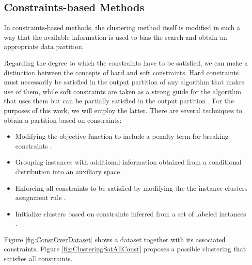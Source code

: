 \subsection{Constraints-based Methods}

In constraints-based methods, the clustering method itself is modified in such a way that the available information is used to bias the search and obtain an appropriate data partition.

Regarding the degree to which the constraints have to be satisfied, we can make a distinction between the concepts of hard \cite{wagstaff2001constrained,davidson2005agglomerative} and soft \cite{law2004clustering,basu2004active,segal2003discovering,davidson2005clustering,law2005model} constraints. Hard constraints must necessarily be satisfied in the output partition of any algorithm that makes use of them, while soft constraints are taken as a strong guide for the algorithm that uses them but can be partially satisfied in the output partition \cite{seret2014new}. For the purposes of this work, we will employ the latter. There are several techniques to obtain a partition based on constraints:

\begin{itemize}
	
	\item  Modifying the objective function to include a penalty term for breaking constraints \cite{demiriz1999semi,davidson2005clustering}.
	
	\item Grouping instances with additional information obtained from a conditional distribution into an auxiliary space \cite{sinkkonen2000semisupervised}.
	
	\item Enforcing all constraints to be satisfied by modifying the the instance clusters assignment rule \cite{wagstaff2001constrained}.
	
	\item Initialize clusters based on constraints inferred from a set of labeled instances \cite{basu2002semi}.
	
\end{itemize}

Figure \ref{fig:ConstOverDataset} shows a dataset together with its associated constraints. Figure \ref{fig:ClusteringSatAllConst} proposes a possible clustering that satisfies all constraints.

